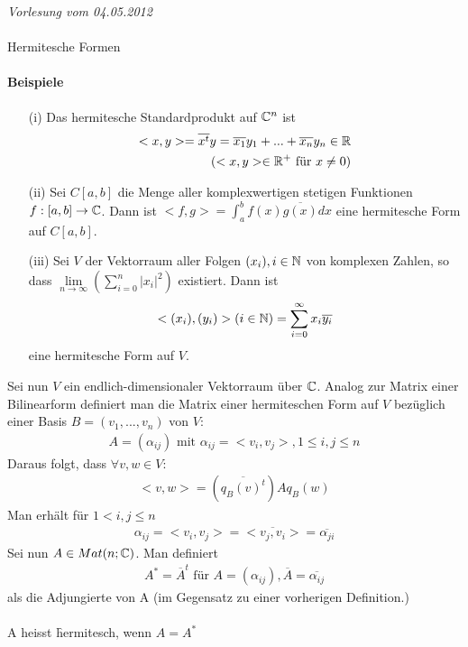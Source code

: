 \newpage
\noindent \textit{Vorlesung vom 04.05.2012} \\\\
\Large Hermitesche Formen \normalsize \\
\paragraph{Beispiele}
\begin{itemize}
\item[(i)] Das hermitesche Standardprodukt auf $\mathbb{C}^n$ ist
\begin{align}
<x, y> = \overline{x^t} y = \overline{x_1} y_1 + ... + \overline{x_n} y_n \in \mathbb{R} \\
(<x, y> \in \mathbb{R}^{+} \text{ für } x \neq 0)
\end{align}
\item[(ii)] Sei $C[a, b]$ die Menge aller komplexwertigen stetigen Funktionen $f:[a, b] \rightarrow \mathbb{C}$. Dann ist $<f, g> = \int_{a}^{b} f(x) \overline{g(x)} dx$ eine hermitesche Form auf $C[a, b]$.
\item[(iii)] Sei $V$ der Vektorraum aller Folgen $(x_i), i \in \mathbb{N}$ von komplexen Zahlen, so dass $ \lim\limits_{n \rightarrow \infty} (\sum_{i=0}^{n} |x_i|^2)$ existiert. Dann ist
\begin{align}
<(x_i), (y_i)> (i \in \mathbb{N}) = \sum_{i = 0}^{\infty} x_i \overline{y_i}
\end{align}
eine hermitesche Form auf $V$.
\end{itemize}
Sei nun $V$ ein endlich-dimensionaler Vektorraum über $\mathbb{C}$. Analog zur Matrix einer Bilinearform definiert man die Matrix einer hermiteschen Form auf $V$ bezüglich einer Basis $B = (v_1, ..., v_n)$ von $V$:
\begin{align}
A = (\alpha_{ij}) \text{ mit } \alpha_{ij} = <v_i, v_j>, 1 \leq i, j \leq n
\end{align}
Daraus folgt, dass $\forall v, w \in V$:
\begin{align}
<v, w> = (\overline{q_B(v)^t}) A q_B(w)
\end{align}
Man erhält für $1 < i, j \leq n$
\begin{align}
\alpha_{ij} = <v_i, v_j> = \overline{<v_j, v_i>} = \overline{\alpha_{ji}}
\end{align}
Sei nun $A \in Mat(n; \mathbb{C})$. Man definiert
\begin{align}
A^{*} = \overline{A}^t \text{ für } A = (\alpha_{ij}), \overline{A} = \overline{\alpha_{ij}}
\end{align}
als die Adjungierte von A (im Gegensatz zu einer vorherigen Definition.)\\\\
A heisst \f{hermitesch}, wenn $A = A^{*}$
